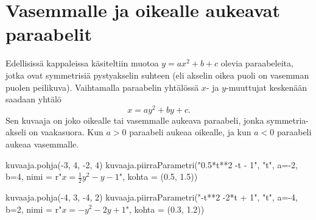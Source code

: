 \section{Vasemmalle ja oikealle aukeavat paraabelit}




Edellisissä kappaleissa käsiteltiin muotoa $y = ax^2 + b + c$ olevia paraabeleita, jotka ovat symmetrisiä pystyakselin suhteen (eli akselin oikea puoli on vasemman puolen peilikuva). Vaihtamalla paraabelin yhtälössä $x$- ja $y$-muuttujat keskenään saadaan yhtälö
\[x=ay^2+by+c.\]
Sen kuvaaja on joko oikealle tai vasemmalle aukeava paraabeli, jonka symmetria-akseli on vaakasuora. Kun $a>0$ paraabeli aukeaa oikealle, ja kun $a < 0$ paraabeli aukeaa vasemmalle.


\begin{kuva}
    kuvaaja.pohja(-3, 4, -2, 4)
    kuvaaja.piirraParametri("0.5*t**2 -t - 1", "t", a=-2, b=4, nimi = r"$x = \frac{1}{2}y^2  - y -1$", kohta = (0.5, 1.5))
\end{kuva}


\begin{kuva}
    kuvaaja.pohja(-4, 3, -4, 2)
    kuvaaja.piirraParametri("-t**2 -2*t + 1", "t", a=-4, b=2, nimi = r"$x = -y^2 - 2y +1$", kohta = (0.3, 1.2))
\end{kuva}



